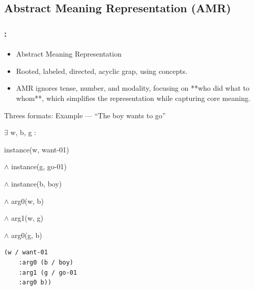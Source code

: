 \documentclass[xcolor=table]{beamer}
\begin{document}
\subsection{Abstract Meaning Representation (AMR)}

\begin{frame}[fragile]
	\frametitle{\insertshortsubtitle: \insertsection}
	\framesubtitle{\insertsubsection}
	
	\begin{itemize}
		\item Abstract Meaning Representation \cite{2013-banarescu-al}
		\item Rooted, labeled, directed, acyclic grap, using   concepts.
		\item AMR ignores tense, number, and modality, focusing on **who did what to whom**, which simplifies the representation while capturing core meaning.
	\end{itemize}

	\begin{exampleblock}{Threes formats: Example --- ``The boy wants to go''}
		\begin{minipage}{.3\textwidth}
			
			\footnotesize
			$ \exists $ w, b, g : 
			
			instance(w, want-01) 
			
			$ \wedge $ instance(g, go-01) 
			
			$ \wedge $ instance(b, boy) 
			
			$ \wedge $ arg0(w, b) 
			
			$ \wedge $ arg1(w, g) 
			
			$ \wedge $ arg0(g, b)
		\end{minipage}
		\begin{minipage}{.35\textwidth}
			
			\begin{verbatim}
(w / want-01
    :arg0 (b / boy)
    :arg1 (g / go-01
    :arg0 b))
			\end{verbatim}
			
		\end{minipage}
		\begin{minipage}{.3\textwidth}
			
		\end{minipage}
	\end{exampleblock}
	
\end{frame}
\end{document}
